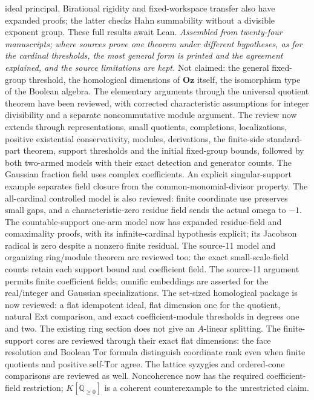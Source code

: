 \documentclass[11pt]{article}
\newcommand{\Oz}{\mathbf{Oz}}
\begin{document}
{ideal principal. Birational rigidity and fixed-workspace transfer also
have expanded proofs; the latter checks Hahn summability without a
divisible exponent group. These full results await Lean.
\emph{Assembled from twenty-four manuscripts; where sources prove one theorem under different hypotheses,
as for the cardinal thresholds, the most general form is printed and the
agreement explained, and the source limitations are kept.} Not claimed:
the general fixed-group threshold, the homological dimensions of $\Oz$
itself, the isomorphism type of the Boolean algebra. The elementary arguments
through the universal quotient theorem have been reviewed, with corrected
characteristic assumptions for integer divisibility and a separate
noncommutative module argument. The review now extends through representations,
small quotients, completions, localizations, positive existential conservativity,
modules, derivations, the finite-side standard-part theorem, support thresholds
and the initial fixed-group bounds, followed by both two-armed models
with their exact detection and generator counts. The Gaussian fraction field
uses complex coefficients. An explicit singular-support example separates
field closure from the common-monomial-divisor property. The all-cardinal
controlled model is also reviewed: finite coordinate use preserves small
gaps, and a characteristic-zero residue field sends the actual omega to $-1$.
The countable-support one-arm model now has expanded residue-field and
comaximality proofs, with its infinite-cardinal hypothesis explicit; its
Jacobson radical is zero despite a nonzero finite residual. The source-11
model and organizing ring/module theorem are reviewed too: the exact
small-scale-field counts retain each support bound and coefficient field.
The source-11 argument permits finite coefficient fields; omnific
embeddings are asserted for the real/integer and Gaussian specializations.
The set-sized homological package is now reviewed: a flat idempotent ideal,
flat dimension one for the quotient, natural Ext comparison, and exact
coefficient-module thresholds in degrees one and two. The existing ring
section does not give an $A$-linear splitting.
The finite-support cores are reviewed through their exact flat dimensions:
the face resolution and Boolean $\mathrm{Tor}$ formula distinguish coordinate
rank even when finite quotients and positive self-$\mathrm{Tor}$ agree.
The lattice syzygies and ordered-cone comparisons are reviewed as well.
Noncoherence now has the required coefficient-field restriction;
$K[\mathbb Q_{\ge0}]$ is a coherent counterexample to the unrestricted claim.
}
\end{document}
